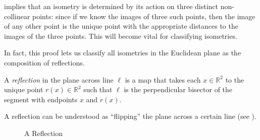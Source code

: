 \documentclass{mystyle}
\begin{document}
 implies that an isometry is determined by its action on three distinct non-collinear points: since if we know the images of three such points, then the image of any other point is the unique point with the appropriate distances to the images of the three points. This will become vital for classifying isometries.

In fact, this proof lets us classify all isometries in the Euclidean plane as the composition of reflections.
\begin{definition}\label{def_reflection}
    A \textit{reflection} in the plane across line $\ell$ is a map that takes each $x \in \mathbb{R}^2$ to the unique point $r(x) \in \mathbb{R}^2$ such that $\ell$ is the perpendicular bisector of the segment with endpoints $x$ and $r(x)$. 
\end{definition}

A reflection can be understood as ``flipping'' the plane across a certain line (see ).

\begin{figure}[ht]
      \centering 
\caption{A Reflection}\label{fig_reflection}
\end{figure}
\end{document}

